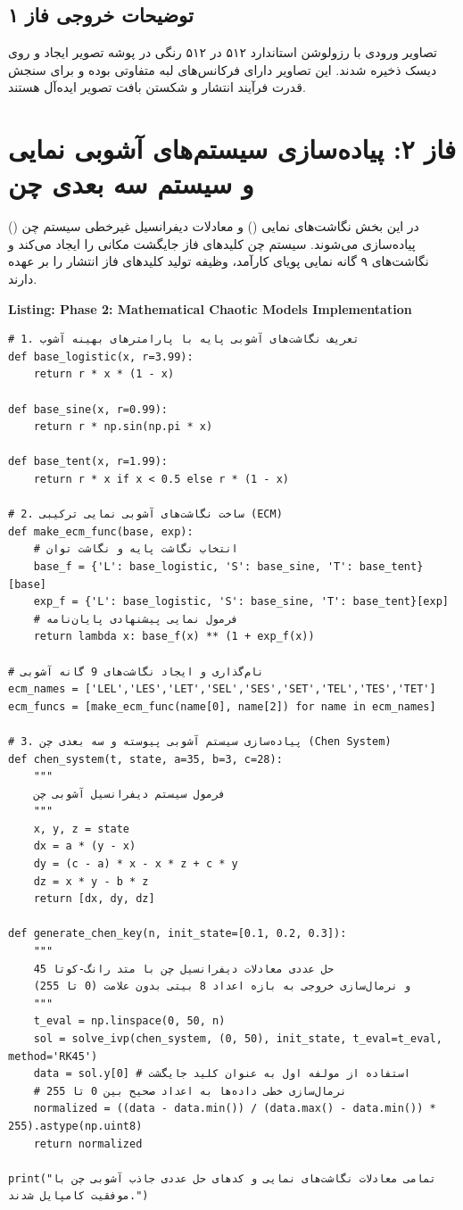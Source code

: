 \subsection*{توضیحات خروجی فاز ۱}
تصاویر ورودی با رزولوشن استاندارد ۵۱۲ در ۵۱۲ رنگی در پوشه تصویر ایجاد و روی دیسک ذخیره شدند. این تصاویر دارای فرکانس‌های لبه متفاوتی بوده و برای سنجش قدرت فرآیند انتشار و شکستن بافت تصویر ایده‌آل هستند.

\section{فاز ۲: پیاده‌سازی سیستم‌های آشوبی نمایی و سیستم سه بعدی چن}
در این بخش نگاشت‌های نمایی () و معادلات دیفرانسیل غیرخطی سیستم چن () پیاده‌سازی می‌شوند. سیستم چن کلیدهای فاز جایگشت مکانی را ایجاد می‌کند و نگاشت‌های ۹ گانه نمایی پویای کارآمد، وظیفه تولید کلیدهای فاز انتشار را بر عهده دارند.

\begin{latin}
\noindent\textbf{Listing: Phase 2: Mathematical Chaotic Models Implementation}
\begin{verbatim}
# 1. تعریف نگاشت‌های آشوبی پایه با پارامترهای بهینه آشوب
def base_logistic(x, r=3.99):
    return r * x * (1 - x)

def base_sine(x, r=0.99):
    return r * np.sin(np.pi * x)

def base_tent(x, r=1.99):
    return r * x if x < 0.5 else r * (1 - x)

# 2. ساخت نگاشت‌های آشوبی نمایی ترکیبی (ECM)
def make_ecm_func(base, exp):
    # انتخاب نگاشت پایه و نگاشت توان
    base_f = {'L': base_logistic, 'S': base_sine, 'T': base_tent}[base]
    exp_f = {'L': base_logistic, 'S': base_sine, 'T': base_tent}[exp]
    # فرمول نمایی پیشنهادی پایان‌نامه
    return lambda x: base_f(x) ** (1 + exp_f(x))

# نام‌گذاری و ایجاد نگاشت‌های 9 گانه آشوبی
ecm_names = ['LEL','LES','LET','SEL','SES','SET','TEL','TES','TET']
ecm_funcs = [make_ecm_func(name[0], name[2]) for name in ecm_names]

# 3. پیاده‌سازی سیستم آشوبی پیوسته و سه بعدی چن (Chen System)
def chen_system(t, state, a=35, b=3, c=28):
    """
    فرمول سیستم دیفرانسیل آشوبی چن
    """
    x, y, z = state
    dx = a * (y - x)
    dy = (c - a) * x - x * z + c * y
    dz = x * y - b * z
    return [dx, dy, dz]

def generate_chen_key(n, init_state=[0.1, 0.2, 0.3]):
    """
    حل عددی معادلات دیفرانسیل چن با متد رانگ-کوتا 45
    و نرمال‌سازی خروجی به بازه اعداد 8 بیتی بدون علامت (0 تا 255)
    """
    t_eval = np.linspace(0, 50, n)
    sol = solve_ivp(chen_system, (0, 50), init_state, t_eval=t_eval, method='RK45')
    data = sol.y[0] # استفاده از مولفه اول به عنوان کلید جایگشت
    # نرمال‌سازی خطی داده‌ها به اعداد صحیح بین 0 تا 255
    normalized = ((data - data.min()) / (data.max() - data.min()) * 255).astype(np.uint8)
    return normalized

print("تمامی معادلات نگاشت‌های نمایی و کدهای حل عددی جاذب آشوبی چن با موفقیت کامپایل شدند.")
\end{verbatim}
\end{latin}

